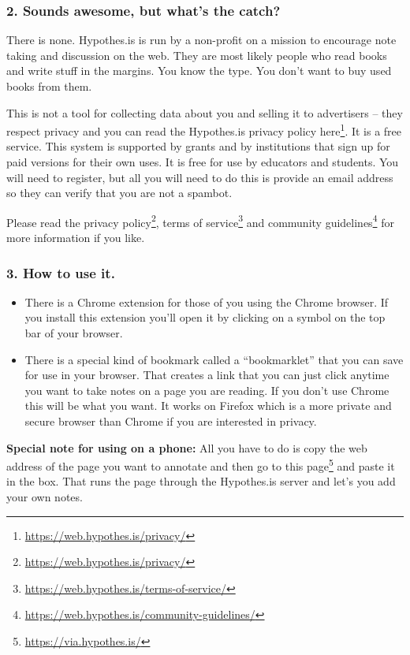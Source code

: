 \documentclass[
  12pt, openany]{book}
\makeatletter
\renewcommand{\href}[2]{#2\footnote{\url{#1}}}
\newenvironment{kframe}{%
\medskip{}
\setlength{\fboxsep}{.8em}
 \def\at@end@of@kframe{}%
 \ifinner\ifhmode%
  \def\at@end@of@kframe{\end{minipage}}%
  \begin{minipage}{\columnwidth}%
 \fi\fi%
 \def\FrameCommand##1{\hskip\@totalleftmargin \hskip-\fboxsep
 \colorbox{shadecolor}{##1}\hskip-\fboxsep
     \hskip-\linewidth \hskip-\@totalleftmargin \hskip\columnwidth}%
 \MakeFramed {\advance\hsize-\width
   \@totalleftmargin\z@ \linewidth\hsize
   \@setminipage}}%
 {\par\unskip\endMakeFramed%
 \at@end@of@kframe}
\newenvironment{rmdblock}[1]
  {
  \begin{itemize}
  \renewcommand{\labelitemi}{
    \raisebox{-.7\height}[0pt][0pt]{
      {\setkeys{Gin}{width=3em,keepaspectratio}\texttt{[image: img/\#1]}}
    }
  }
  \setlength{\fboxsep}{1em}
  \begin{kframe}
  \item
  }
  {
  \end{kframe}
  \end{itemize}
  }
\newenvironment{note}
  {\begin{rmdblock}{note}}
  {\end{rmdblock}}
\theoremstyle{definition}
\theoremstyle{definition}
\theoremstyle{definition}
\theoremstyle{definition}
\theoremstyle{remark}
\makeatother
\begin{document}
\hypertarget{sounds-awesome-but-whats-the-catch}{%
\subsubsection*{2. Sounds awesome, but what's the catch?}\label{sounds-awesome-but-whats-the-catch}}


There is none. Hypothes.is is run by a non-profit on a mission to encourage note taking and discussion on the web. They are most likely people who read books and write stuff in the margins. You know the type. You don't want to buy used books from them.

This is not a tool for collecting data about you and selling it to advertisers -- they respect privacy and you can read \href{https://web.hypothes.is/privacy/}{the Hypothes.is privacy policy here}. It is a free service. This system is supported by grants and by institutions that sign up for paid versions for their own uses. It is free for use by educators and students. You will need to register, but all you will need to do this is provide an email address so they can verify that you are not a spambot.

Please read the \href{https://web.hypothes.is/privacy/}{privacy policy}, \href{https://web.hypothes.is/terms-of-service/}{terms of service} and \href{https://web.hypothes.is/community-guidelines/}{community guidelines} for more information if you like.

\hypertarget{how-to-use-it.}{%
\subsubsection*{3. How to use it.}\label{how-to-use-it.}}


\begin{itemize}
\item
  There is a Chrome extension for those of you using the Chrome browser. If you install this extension you'll open it by clicking on a symbol on the top bar of your browser.
\item
  There is a special kind of bookmark called a ``bookmarklet'' that you can save for use in your browser. That creates a link that you can just click anytime you want to take notes on a page you are reading. If you don't use Chrome this will be what you want. It works on Firefox which is a more private and secure browser than Chrome if you are interested in privacy.
\end{itemize}

\begin{note}
\textbf{Special note for using on a phone:} All you have to do is copy the web address of the page you want to annotate and then \href{https://via.hypothes.is/}{go to this page} and paste it in the box. That runs the page through the Hypothes.is server and let's you add your own notes.

\end{note}
\end{document}
